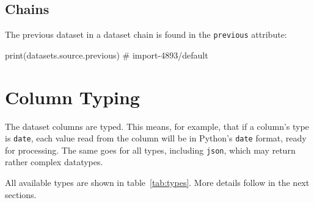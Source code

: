 \subsection*{Chains}
The previous dataset in a dataset chain is found in the
\texttt{previous} attribute:
\begin{python}
print(datasets.source.previous)
# import-4893/default
\end{python}



\newpage
\section{Column Typing}
The dataset columns are typed.  This means, for example, that if a
column's type is \texttt{date}, each value read from the column will
be in Python's \texttt{date} format, ready for processing.  The same
goes for all types, including \texttt{json}, which may return rather
complex datatypes.

All available types are shown in table~\ref{tab:types}.  More details
follow in the next sections.




